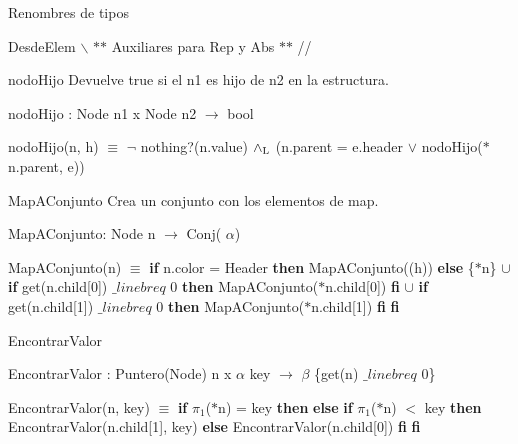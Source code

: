 \begin{DoxyParagraph}{\-Renombres de tipos}
\begin{DoxyParagraph}{\-Desde\-Elem}
$\backslash$ $\ast$$\ast$ \-Auxiliares para \-Rep y \-Abs $\ast$$\ast$ //

\begin{DoxyParagraph}{nodo\-Hijo}
\-Devuelve true si el n1 es hijo de n2 en la estructura.
\end{DoxyParagraph}
nodo\-Hijo \-: \-Node n1 x \-Node n2 $\to$ bool\par
 nodo\-Hijo(n, h) $\equiv$ $\lnot$ nothing?(n.\-value) $\land_{\rm L}$ (n.\-parent = e.\-header $\lor$ nodo\-Hijo($\ast$n.parent, e)) 

\begin{DoxyParagraph}{\-Map\-A\-Conjunto}
\-Crea un conjunto con los elementos de map.
\end{DoxyParagraph}
\-Map\-A\-Conjunto\-: \-Node n $\to$ \-Conj( $\alpha$)\par
 \-Map\-A\-Conjunto(n) $\equiv$ {\bfseries if} n.\-color = \-Header {\bfseries then} \-Map\-A\-Conjunto((h)) {\bfseries else} \{$\ast$n\} $\cup$ {\bfseries if} get(n.\-child\mbox{[}0\mbox{]}) $\_linebr eq$ 0 {\bfseries then} \-Map\-A\-Conjunto($\ast$n.child\mbox{[}0\mbox{]}) {\bfseries fi} $\cup$ {\bfseries if} get(n.\-child\mbox{[}1\mbox{]}) $\_linebr eq$ 0 {\bfseries then} \-Map\-A\-Conjunto($\ast$n.child\mbox{[}1\mbox{]}) {\bfseries fi} {\bfseries fi} 

\begin{DoxyParagraph}{\-Encontrar\-Valor}

\end{DoxyParagraph}
\-Encontrar\-Valor \-: \-Puntero(\-Node) n x $\alpha$ key $\to$ $\beta$ \{get(n) $\_linebr eq$ 0\}\par
 \-Encontrar\-Valor(n, key) $\equiv$ {\bfseries if} $\pi_1$($\ast$n) = key {\bfseries then}  {\bfseries else} {\bfseries if} $\pi_1$($\ast$n) $<$ key {\bfseries then} \-Encontrar\-Valor(n.\-child\mbox{[}1\mbox{]}, key) {\bfseries else} \-Encontrar\-Valor(n.\-child\mbox{[}0\mbox{]}) {\bfseries fi} {\bfseries fi} 


\end{DoxyParagraph}
\end{DoxyParagraph}
